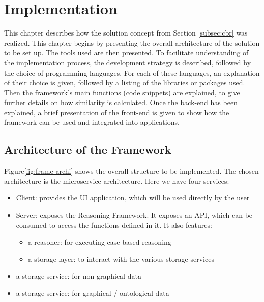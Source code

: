 \section{Implementation\label{sec:implementation}}
This chapter describes how the solution concept from Section \ref{subsec:cbr} was realized. This chapter begins by presenting the overall architecture of the solution to be set up. The tools used are then presented. To facilitate understanding of the implementation process, the development strategy is described, followed by the choice of programming languages. For each of these languages, an explanation of their choice is given, followed by a listing of the libraries or packages used. Then the framework's main functions (code snippets) are explained, to give further details on how similarity is calculated. Once the back-end has been explained, a brief presentation of the front-end is given to show how the framework can be used and integrated into applications.


\subsection{Architecture of the Framework \label{subsec:archi-frame}}
Figure\ref{fig:frame-archi} shows the overall structure to be implemented. The chosen architecture is the microservice architecture. Here we have four services:
\begin{itemize}
    \item Client: provides the UI application, which will be used directly by the user
    \item Server: exposes the Reasoning Framework. It exposes an API, which can be consumed to access the functions defined in it. It also features:
    \begin{itemize}
        \item a reasoner: for executing case-based reasoning
        \item a storage layer: to interact with the various storage services
    \end{itemize}
    
    \item a storage service: for non-graphical data
    \item a storage service: for graphical / ontological data
\end{itemize}


